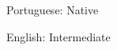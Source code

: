 

\begin{cvparagraph}
  \begin{svitems}
    \item {Portuguese: Native}
    \item {English: Intermediate}
  \end{svitems}


\end{cvparagraph}
